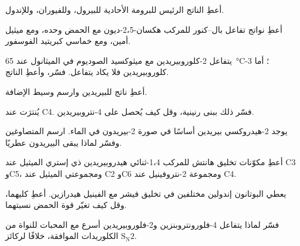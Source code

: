 \begin{exercise}[$\star$]\label{exo:b3:heterocycles:3}
أعطِ الناتج الرئيس للبرومة الأحادية للبيرول، وللفيوران، وللإندول.
\end{exercise}

\begin{exercise}[$\star$]\label{exo:b3:heterocycles:4}
أعطِ نواتج تفاعل بال--كنور للمركب هكسان-2،5-ديون مع الحمض وحده،
ومع ميثيل أمين، ومع خماسي كبريتيد الفوسفور.
\end{exercise}

\begin{exercise}[$\star\star$]\label{exo:b3:heterocycles:5}
يتفاعل 2-كلوروبيريدين مع ميثوكسيد الصوديوم في الميثانول عند \qty{65}{\celsius}؛ أما 3-كلوروبيريدين
فلا يكاد يتفاعل. فسّر، وأعطِ الناتج.
\end{exercise}

\begin{exercise}[$\star\star$]\label{exo:b3:heterocycles:6}
أعطِ ناتج  للبيريدين وارسم وسيط
الإضافة.
\end{exercise}

\begin{exercise}[$\star\star$]\label{exo:b3:heterocycles:7}
يُنترَت  عند C4. فسّر ذلك ببنى رنينية، وقل كيف
يُحصل على 4-نتروبيريدين.
\end{exercise}

\begin{exercise}[$\star\star$]\label{exo:b3:heterocycles:8}
يوجد 2-هيدروكسي بيريدين أساسًا في صورة 2-بيريدون في الماء. ارسم المتصاوغين 
وفسّر لماذا يبقى البيريدون عطريًا.
\end{exercise}

\begin{exercise}[$\star\star$]\label{exo:b3:heterocycles:9}
أعطِ مكوّنات تخليق هانتش للمركب 1،4-ثنائي هيدروبيريدين ذي
إستري الميثيل عند C3 وC5، ومجموعتي الميثيل عند C2 وC6 ومجموعة 2-نتروفينيل
عند C4.
\end{exercise}

\begin{exercise}[$\star\star\star$]\label{exo:b3:heterocycles:10}
يعطي البوتانون إندولين مختلفين في تخليق فيشر مع
الفينيل هيدرازين. أعطِ كليهما، وقل كيف تغيّر قوة الحمض نسبتهما.
\end{exercise}

\begin{exercise}[$\star\star\star$]\label{exo:b3:heterocycles:11}
فسّر لماذا يتفاعل 4-فلورونتروبنزين و2-فلوروبيريدين أسرع مع
المحبات للنواة من الكلوريدات الموافقة، خلافًا لركائز $\mathrm S_\mathrm N2$.
\end{exercise}

